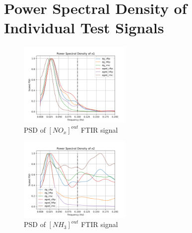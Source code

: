 \section{Power Spectral Density of Individual Test Signals}

\begin{multicols}{2}
       \begin{figure}[H]
        \centering
        \includegraphics[width=0.48\textwidth]{./figs/bfr_smth/test_psd/x1.png}
        \caption{PSD of $[NO_x]^{out}$ FTIR signal}
       \end{figure}

       \begin{figure}[H]
        \centering
        \includegraphics[width=0.48\textwidth]{./figs/bfr_smth/test_psd/x2.png}
        \caption{PSD of $[NH_3]^{out}$ FTIR signal}
       \end{figure}
\end{multicols}
